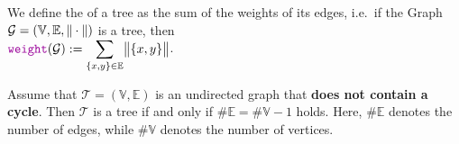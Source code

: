 \begin{Definition}
We define the  of a tree  as the sum of the weights of its edges,
i.e.~if the Graph $\mathcal{G} = (\mathbb{V},\mathbb{E}, \|\cdot\|)$ is a tree, then
\\[0.2cm]
\hspace*{1.3cm}
$\ds \mytt{weight}(\mathcal{G}) := \sum\limits_{\{x,y\} \in \mathbb{E}} \Weight{\{x,y\}}$.  \eoxs
\end{Definition}

\begin{Proposition}
  Assume that $\mathcal{T} = (\mathbb{V},\mathbb{E})$ is an undirected graph that \textbf{does not contain a cycle}.
  Then $\mathcal{T}$ is a tree if and only if $\#\mathbb{E} = \#\mathbb{V} - 1$ holds.  Here, $\#\mathbb{E}$ denotes the number of edges,
  while $\#\mathbb{V}$ denotes the number of vertices.  
\end{Proposition}

